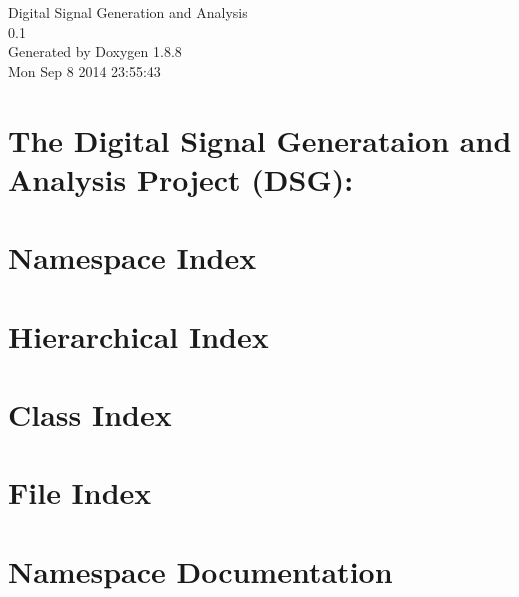 \documentclass[twoside]{book}
\newcommand{\+}{\discretionary{\mbox{\scriptsize$\hookleftarrow$}}{}{}}
\newcommand{\clearemptydoublepage}{%
  \newpage{\pagestyle{empty}\cleardoublepage}%
}
\begin{document}
\hypersetup{pageanchor=false,
             bookmarks=true,
             bookmarksnumbered=true,
             pdfencoding=unicode
            }
\begin{titlepage}
\vspace*{7cm}
\begin{center}%
{\Large Digital Signal Generation and Analysis \\[1ex]\large 0.\+1 }\\
\vspace*{1cm}
{\large Generated by Doxygen 1.8.8}\\
\vspace*{0.5cm}
{\small Mon Sep 8 2014 23:55:43}\\
\end{center}
\end{titlepage}
\clearemptydoublepage
\tableofcontents
\clearemptydoublepage
{}
\hypersetup{pageanchor=true}

\chapter{The Digital Signal Generataion and Analysis Project (D\+S\+G)\+:}
\label{index}\hypertarget{index}{}
\chapter{Namespace Index}

\chapter{Hierarchical Index}

\chapter{Class Index}

\chapter{File Index}

\chapter{Namespace Documentation}









\end{document}
